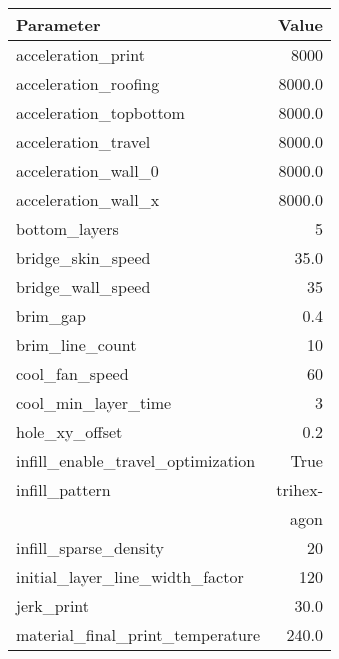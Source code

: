 \begin{multicols}{2}
    \begin{table}[H]
        \scriptsize
        \begin{tabular}{ |l|r| }
            \hline
            \textbf{Parameter}                    & \textbf{Value} \\
            \hline
            acceleration\_print                   & 8000           \\
            acceleration\_roofing                 & 8000.0         \\
            acceleration\_topbottom               & 8000.0         \\
            acceleration\_travel                  & 8000.0         \\
            acceleration\_wall\_0                 & 8000.0         \\
            acceleration\_wall\_x                 & 8000.0         \\
            bottom\_layers                        & 5              \\
            bridge\_skin\_speed                   & 35.0           \\
            bridge\_wall\_speed                   & 35             \\
            brim\_gap                             & 0.4            \\
            brim\_line\_count                     & 10             \\
            cool\_fan\_speed                      & 60             \\
            cool\_min\_layer\_time                & 3              \\
            hole\_xy\_offset                      & 0.2            \\
            infill\_enable\_travel\_optimization  & True           \\
            infill\_pattern                       & trihex-        \\
                                                  & agon           \\
            infill\_sparse\_density               & 20             \\
            initial\_layer\_line\_width\_factor   & 120            \\
            jerk\_print                           & 30.0           \\
            material\_final\_print\_temperature   & 240.0          \\

\end{tabular}
\end{table}
\end{multicols}
